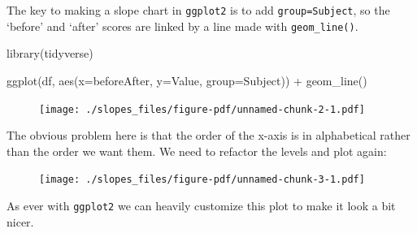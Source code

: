 \documentclass[
  letterpaper,
  DIV=11,
  numbers=noendperiod]{scrreprt}
\newenvironment{Shaded}{\begin{snugshade}}{\end{snugshade}}
\newcommand{\AttributeTok}[1]{\textcolor[rgb]{0.40,0.45,0.13}{#1}}
\newcommand{\FunctionTok}[1]{\textcolor[rgb]{0.28,0.35,0.67}{#1}}
\newcommand{\NormalTok}[1]{\textcolor[rgb]{0.00,0.23,0.31}{#1}}
\newcommand{\OtherTok}[1]{\textcolor[rgb]{0.00,0.23,0.31}{#1}}
\newcommand{\SpecialCharTok}[1]{\textcolor[rgb]{0.37,0.37,0.37}{#1}}
\newcommand{\StringTok}[1]{\textcolor[rgb]{0.13,0.47,0.30}{#1}}
\begin{document}
The key to making a slope chart in \texttt{ggplot2} is to add
\texttt{group=Subject}, so the `before' and `after' scores are linked by
a line made with \texttt{geom\_line()}.

\begin{Shaded}
\begin{Highlighting}[]
\FunctionTok{library}\NormalTok{(tidyverse)}

\FunctionTok{ggplot}\NormalTok{(df, }\FunctionTok{aes}\NormalTok{(}\AttributeTok{x=}\NormalTok{beforeAfter, }\AttributeTok{y=}\NormalTok{Value, }\AttributeTok{group=}\NormalTok{Subject)) }\SpecialCharTok{+}
  \FunctionTok{geom\_line}\NormalTok{()}
\end{Highlighting}
\end{Shaded}

\begin{figure}[H]

{\centering \texttt{[image: ./slopes\_files/figure-pdf/unnamed-chunk-2-1.pdf]}

}

\end{figure}

The obvious problem here is that the order of the x-axis is in
alphabetical rather than the order we want them. We need to refactor the
levels and plot again:

\begin{Shaded}
\end{Shaded}

\begin{figure}[H]

{\centering \texttt{[image: ./slopes\_files/figure-pdf/unnamed-chunk-3-1.pdf]}

}

\end{figure}

As ever with \texttt{ggplot2} we can heavily customize this plot to make
it look a bit nicer.
\end{document}
